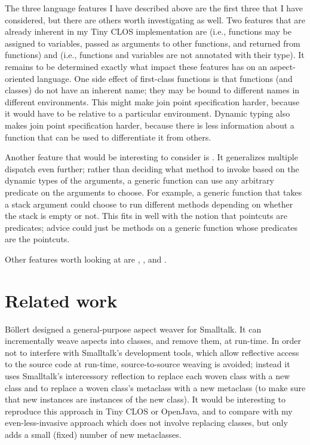 \documentclass[12pt]{article}
\begin{document}
The three language features I have described above are the first three
that I have considered, but there are others worth investigating as
well.  Two features that are already inherent in my Tiny CLOS
implementation are  (i.e., functions may
be assigned to variables, passed as arguments to other functions, and
returned from functions) and  (i.e., functions
and variables are not annotated with their type).  It remains to be
determined exactly what impact these features has on an
aspect-oriented language.  One side effect of first-class functions is
that functions (and classes) do not have an inherent name; they may be
bound to different names in different environments.  This might make
join point specification harder, because it would have to be relative
to a particular environment.  Dynamic typing also makes join point
specification harder, because there is less information about a
function that can be used to differentiate it from others.

Another feature that would be interesting to consider is
 \cite{predicate-dispatch}.  It
generalizes multiple dispatch even further; rather than deciding what
method to invoke based on the dynamic types of the arguments, a
generic function can use any arbitrary predicate on the arguments to
choose.  For example, a generic function  that takes a stack
argument could choose to run different methods depending on whether
the stack is empty or not.  This fits in well with the notion that
pointcuts are predicates; advice could just be methods on a generic
function whose predicates are the pointcuts.

Other features worth looking at are ,
, and .

\section{Related work}


B\"ollert \cite{AOP-ST} designed a general-purpose aspect
weaver for Smalltalk.  It can incrementally weave aspects into
classes, and remove them, at run-time.  In order not to interfere with
Smalltalk's development tools, which allow reflective access to the
source code at run-time, source-to-source weaving is avoided; instead
it uses Smalltalk's intercessory reflection to replace each woven
class with a new class and to replace a woven class's metaclass with a
new metaclass (to make sure that new instances are instances of the
new class).  It would be interesting to reproduce this approach in
Tiny CLOS or OpenJava, and to compare with my even-less-invasive
approach which does not involve replacing classes, but only adds a
small (fixed) number of new metaclasses.
\end{document}
